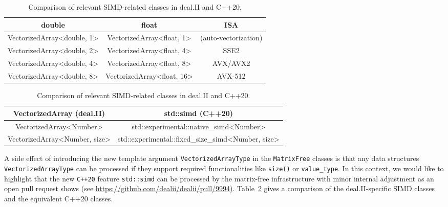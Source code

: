 \documentclass{ansarticle-preprint}
\begin{document}
\begin{table}
\caption{Supported vector lengths of the class \texttt{VectorizedArray} and 
the corresponding instruction-set-architecture extensions. }\label{tab:vectorizedarray}
\centering
\begin{tabular}{ccc}
\toprule
\textbf{double} & \textbf{float} & \textbf{ISA}\\
\midrule
VectorizedArray<double, 1> & VectorizedArray<float, 1> & (auto-vectorization) \\
VectorizedArray<double, 2> & VectorizedArray<float, 4> & SSE2 \\ 
VectorizedArray<double, 4> & VectorizedArray<float, 8> & AVX/AVX2 \\ 
VectorizedArray<double, 8> & VectorizedArray<float, 16> & AVX-512 \\ 
\bottomrule
\end{tabular}

\caption{Comparison of relevant SIMD-related classes in deal.II and C++20.}\label{tab:simd}
\centering
\begin{tabular}{cc}
\toprule
\textbf{VectorizedArray (deal.II)} & \textbf{std::simd (C++20)} \\
\midrule
VectorizedArray<Number> & std::experimental::native\_simd<Number> \\
VectorizedArray<Number, size> & std::experimental::fixed\_size\_simd<Number, size> \\ \bottomrule
\end{tabular}
\end{table}

A side effect of introducing the new template argument \texttt{VectorizedArrayType} 
in the \texttt{MatrixFree} classes is that any data structures 
\texttt{VectorizedArrayType} can be processed if they support required 
functionalities like \texttt{size()} or \texttt{value\_type}. In this context, we 
would like to highlight that the new \texttt{C++20} feature \texttt{std::simd} 
can be processed by the matrix-free infrastructure with minor internal 
adjustment as an open pull request shows 
(see \url{https://github.com/dealii/dealii/pull/9994}).  
Table~\ref{tab:simd} gives a comparison of the deal.II-specific SIMD classes and 
the equivalent C++20 classes. 
\end{document}
